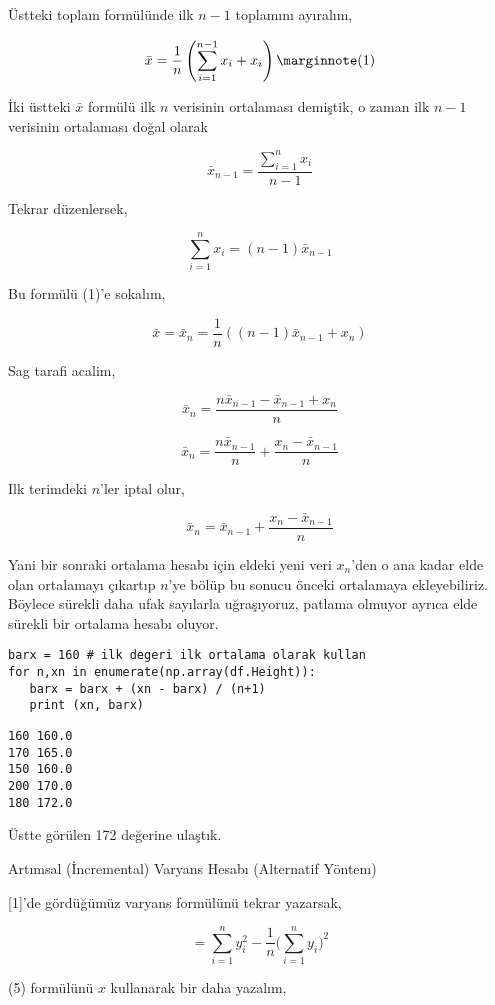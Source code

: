\documentclass[12pt,fleqn]{article}\usepackage{../../common}
\begin{document}
Üstteki toplam formülünde ilk $n-1$ toplamını ayıralım, 

$$
\bar{x} = \frac{1}{n} \left( \sum _{i=1}^{n-1} x_i + x_i \right)
\mlabel{1}
$$

İki üstteki $\bar{x}$ formülü ilk $n$ verisinin ortalaması demiştik,
o zaman ilk $n-1$ verisinin ortalaması doğal olarak

$$
\bar{x}_{n-1}  = \frac{\sum_{i=1}^{n} x_i}{n-1} 
$$

Tekrar düzenlersek,

$$
\sum_{i=1}^{n} x_i  = (n-1) \bar{x}_{n-1}  
$$

Bu formülü (1)'e sokalım,

$$
\bar{x} = \bar{x}_n = \frac{1}{n} \left( (n-1) \bar{x}_{n-1} + x_n \right)
$$

Sag tarafi acalim,

$$
\bar{x}_n = \frac{n \bar{x}_{n-1} - \bar{x}_{n-1} + x_n}{n}
$$

$$
\bar{x}_n = \frac{n \bar{x}_{n-1}}{n} + \frac{x_n - \bar{x}_{n-1}}{n}
$$

Ilk terimdeki $n$'ler iptal olur,

$$
\bar{x}_n = \bar{x}_{n-1} + \frac{x_n - \bar{x}_{n-1}}{n}
$$

Yani bir sonraki ortalama hesabı için eldeki yeni veri $x_n$'den o ana kadar
elde olan ortalamayı çıkartıp $n$'ye bölüp bu sonucu önceki ortalamaya
ekleyebiliriz. Böylece sürekli daha ufak sayılarla uğraşıyoruz, patlama
olmuyor ayrıca elde sürekli bir ortalama hesabı oluyor. 

\begin{verbatim}
barx = 160 # ilk degeri ilk ortalama olarak kullan
for n,xn in enumerate(np.array(df.Height)):
   barx = barx + (xn - barx) / (n+1)
   print (xn, barx)   
\end{verbatim}

\begin{verbatim}
160 160.0
170 165.0
150 160.0
200 170.0
180 172.0
\end{verbatim}

Üstte görülen 172 değerine ulaştık.

Artımsal (İncremental) Varyans Hesabı (Alternatif Yöntem)

[1]'de gördüğümüz varyans formülünü tekrar yazarsak,

$$ = \sum _{i=1}^{n} y_i^2 - \frac{1}{n} \bigg( \sum _{i=1}^{n} y_i \bigg)^2 $$

(5) formülünü $x$ kullanarak bir daha yazalım,
\end{document}
